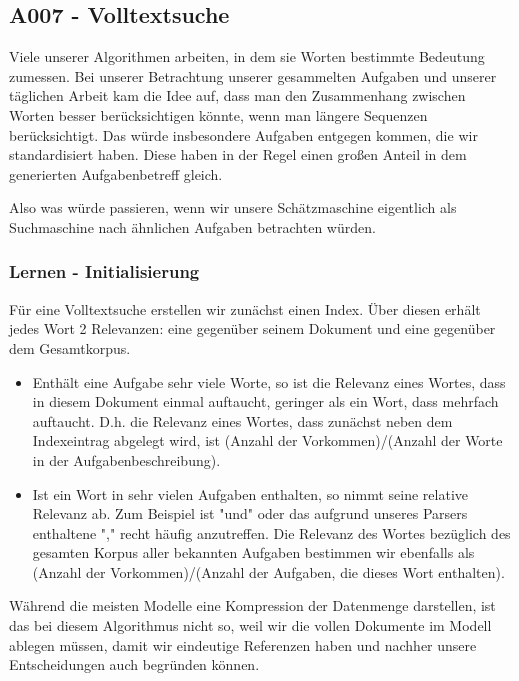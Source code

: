 \newpage{}

\subsection{A007 - Volltextsuche}

Viele unserer Algorithmen arbeiten, in dem sie Worten bestimmte Bedeutung zumessen.
Bei unserer Betrachtung unserer gesammelten Aufgaben und unserer täglichen Arbeit kam die Idee auf, dass man den Zusammenhang zwischen Worten besser berücksichtigen könnte, wenn man längere Sequenzen berücksichtigt. 
Das würde insbesondere Aufgaben entgegen kommen, die wir standardisiert haben.
Diese haben in der Regel einen großen Anteil in dem generierten Aufgabenbetreff gleich.

Also was würde passieren, wenn wir unsere Schätzmaschine eigentlich als Suchmaschine nach ähnlichen Aufgaben betrachten würden.

\subsubsection{Lernen - Initialisierung}

Für eine Volltextsuche erstellen wir zunächst einen Index. Über diesen erhält jedes Wort 2 Relevanzen: eine gegenüber seinem Dokument und eine gegenüber dem Gesamtkorpus.

\begin{itemize}
        \tightlist
        \item Enthält eine Aufgabe sehr viele Worte, so ist die Relevanz eines Wortes, dass in diesem Dokument einmal auftaucht, geringer als ein Wort, dass mehrfach auftaucht. D.h. die Relevanz eines Wortes, dass zunächst neben dem Indexeintrag abgelegt wird, ist (Anzahl der Vorkommen)/(Anzahl der Worte in der Aufgabenbeschreibung).
        \item Ist ein Wort in sehr vielen Aufgaben enthalten, so nimmt seine relative Relevanz ab. Zum Beispiel ist "und" oder das aufgrund unseres Parsers enthaltene "," recht häufig anzutreffen. Die Relevanz des Wortes bezüglich des gesamten Korpus aller bekannten Aufgaben bestimmen wir ebenfalls als (Anzahl der Vorkommen)/(Anzahl der Aufgaben, die dieses Wort enthalten).
\end{itemize}

Während die meisten Modelle eine Kompression der Datenmenge darstellen, ist das bei diesem Algorithmus nicht so, weil wir die vollen Dokumente im Modell ablegen müssen, damit wir eindeutige Referenzen haben und nachher unsere Entscheidungen auch begründen können.

